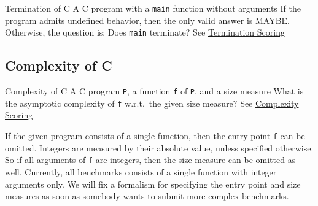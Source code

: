 \begin{formalproblem}
  {Termination of C}
  {A C program with a \texttt{main} function without arguments}
  {If the program admits undefined behavior, then the only valid answer is MAYBE.
    Otherwise, the question is: Does \texttt{main} terminate?}
  {See \hyperref[scoring_termination]{Termination Scoring}}
\end{formalproblem}

\subsection{Complexity of C}

\begin{formalproblem}
  {Complexity of C}
  {A C program \texttt{P}, a function \texttt{f} of \texttt{P}, and a size measure}
  {What is the asymptotic complexity of \texttt{f} w.r.t.\ the given size measure?}
  {See \hyperref[scoring_complexity]{Complexity Scoring}}
\end{formalproblem}

If the given program consists of a single function, then the entry point \texttt{f} can be omitted.
%
Integers are measured by their absolute value, unless specified otherwise.
%
So if all arguments of \texttt{f} are integers, then the size measure can be omitted as well.
%
Currently, all benchmarks consists of a single function with integer arguments only.
%
We will fix a formalism for specifying the entry point and size measures as soon as somebody wants to submit more complex benchmarks.
